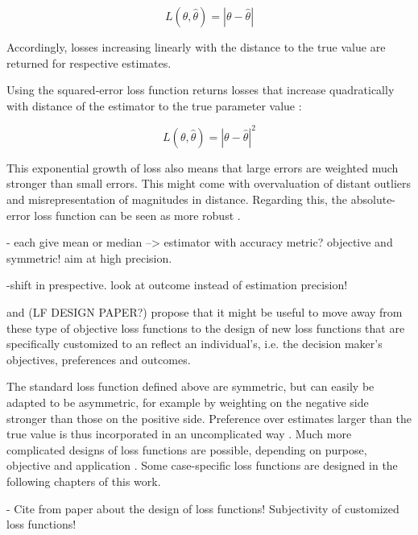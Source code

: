         \begin{equation}\label{eq:LossFunction}
        L(\theta,\hat{\theta}) = |\theta - \hat{\theta}|
        \end{equation}        
        
        Accordingly, losses increasing linearly with the distance to the true value are returned for respective estimates.
        
        Using the squared-error loss function returns losses that increase quadratically with distance of the estimator to the true parameter value \cite{davidson2015}:
        
        \begin{equation}\label{eq:LossFunction}
        L(\theta,\hat{\theta}) = |\theta - \hat{\theta}|^2
        \end{equation}        
        
        This exponential growth of loss also means that large errors are weighted much stronger than small errors. This might come with overvaluation of distant outliers and misrepresentation of magnitudes in distance. Regarding this, the absolute-error loss function can be seen as more robust \cite{davidson2015}.
        
        - each give mean or median --> estimator with accuracy metric? objective and symmetric! aim at high precision. 
        
        -shift in prespective. look at outcome instead of estimation precision!     
           
        \cite{davidson2015} and (LF DESIGN PAPER?) propose that it might be useful to move away from these type of objective loss functions to the design of new loss functions that are specifically customized to an reflect an individual's, i.e. the decision maker's objectives, preferences and outcomes. 
        
        The standard loss function defined above are symmetric, but can easily be adapted to be asymmetric, for example by weighting on the negative side stronger than those on the positive side. Preference over estimates larger than the true value is thus incorporated in an uncomplicated way \cite{davidson2015}. Much more complicated designs of loss functions are possible, depending on purpose, objective and application \cite{davidson2015}. Some case-specific loss functions are designed in the following chapters of this work.
        
        - Cite from paper about the design of loss functions! Subjectivity of customized loss functions!
        
